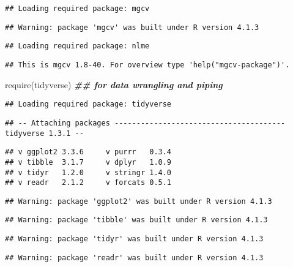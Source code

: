 \documentclass[
]{article}
\newenvironment{Shaded}{\begin{snugshade}}{\end{snugshade}}
\newcommand{\DocumentationTok}[1]{\textcolor[rgb]{0.56,0.35,0.01}{\textbf{\textit{#1}}}}
\newcommand{\FunctionTok}[1]{\textcolor[rgb]{0.00,0.00,0.00}{#1}}
\newcommand{\NormalTok}[1]{#1}
\begin{document}
\begin{verbatim}
## Loading required package: mgcv
\end{verbatim}

\begin{verbatim}
## Warning: package 'mgcv' was built under R version 4.1.3
\end{verbatim}

\begin{verbatim}
## Loading required package: nlme
\end{verbatim}

\begin{verbatim}
## This is mgcv 1.8-40. For overview type 'help("mgcv-package")'.
\end{verbatim}

\begin{Shaded}
\begin{Highlighting}[]
\FunctionTok{require}\NormalTok{(tidyverse) }\DocumentationTok{\#\# for data  wrangling and piping}
\end{Highlighting}
\end{Shaded}

\begin{verbatim}
## Loading required package: tidyverse
\end{verbatim}

\begin{verbatim}
## -- Attaching packages --------------------------------------- tidyverse 1.3.1 --
\end{verbatim}

\begin{verbatim}
## v ggplot2 3.3.6     v purrr   0.3.4
## v tibble  3.1.7     v dplyr   1.0.9
## v tidyr   1.2.0     v stringr 1.4.0
## v readr   2.1.2     v forcats 0.5.1
\end{verbatim}

\begin{verbatim}
## Warning: package 'ggplot2' was built under R version 4.1.3
\end{verbatim}

\begin{verbatim}
## Warning: package 'tibble' was built under R version 4.1.3
\end{verbatim}

\begin{verbatim}
## Warning: package 'tidyr' was built under R version 4.1.3
\end{verbatim}

\begin{verbatim}
## Warning: package 'readr' was built under R version 4.1.3
\end{verbatim}
\end{document}
